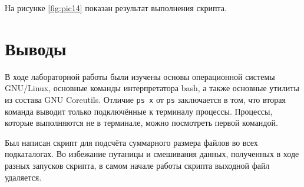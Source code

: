 

На рисунке \ref{fig:pic14} показан результат выполнения скрипта.


\section{Выводы}
\label{sec:out}

В ходе лабораторной работы были изучены основы операционной системы GNU/Linux, основные команды интерпретатора bash, а также основные утилиты из состава GNU Coreutils. Отличие \lstinline{ps x} от \lstinline{ps} заключается в том, что вторая команда выводит только подключённые к терминалу процессы. Процессы, которые выполняются не в терминале, можно посмотреть первой командой.

Был написан скрипт для подсчёта суммарного размера файлов во всех подкаталогах. Во избежание путаницы и смешивания данных, полученных в ходе разных запусков скрипта, в самом начале работы скрипта выходной файл удаляется.

